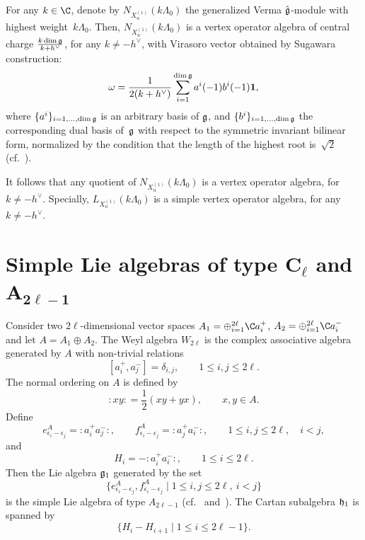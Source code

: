 {\sloppy For any $k \in \C$, denote by $N_{X_{n} ^{(1)}}(k \Lambda _0)$ the
generalized Verma $\hat{\frak g}$-module with highest weight~$k
\Lambda _0$. Then, $N_{X_{n} ^{(1)}}(k \Lambda _0)$ is a vertex
operator algebra of central charge $\frac{k \dim \frak
g}{k+h^{\vee}}$, for any $k \neq - h^{\vee}$, with Virasoro vector
obtained by Sugawara construction:
\begin{gather} \label{Vir-Sugawara}
\omega=\frac{1}{2(k+h^{\vee})}\sum_{i=1}^{\dim {\frak g}}
a^{i}(-1)b^{i}(-1){\bf 1},
\end{gather}
where $\{a^{i}\}_{i=1, \dots, \dim {\frak g}}$ is an arbitrary basis
of ${\frak g}$, and $\{b^{i}\}_{i=1, \dots, \dim {\frak g}}$  the
corresponding dual basis of~${\frak g}$ with respect to the
symmetric invariant bilinear form, normalized by the condition that
the length of the highest root is~$\sqrt{2}$ (cf.~\cite{FrB,FZ,K,LL,L}).

}

It follows that any quotient of $N_{X_{n} ^{(1)}}(k \Lambda _0)$ is
a vertex operator algebra, for $k \neq - h^{\vee}$. Specially,
$L_{X_{n} ^{(1)}}(k \Lambda _0)$ is a simple vertex operator
algebra, for any $k \neq - h^{\vee}$.



\section[Simple Lie algebras of type $C_{\ell}$ and $A_{2\ell -1}$]{Simple Lie algebras of type $\boldsymbol{C_{\ell}}$ and $\boldsymbol{A_{2\ell -1}}$}

Consider two $2 \ell$-dimensional vector spaces $A_1 = \oplus
_{i=1} ^{2 \ell}{\C} a_i ^+$, $ A_2 = \oplus _{i=1}^ {2 \ell} {\C}
a_i^-$ and let $A=A_1 {\oplus} A_2$. The Weyl algebra $W_{2 \ell}$ is
the complex associative algebra generated by $A$ with non-trivial
relations
\[
[a_i ^+,a_j^-]=\delta_{i,j} , \qquad 1 \le i,j \le 2 \ell.
\]
%
The normal ordering on $A$ is def\/ined by
\[
:\!xy\!:    = \frac 1 2 (xy+yx),  \qquad x,y \in A .
\]
Def\/ine
\[
e_{\epsilon_i-\epsilon_j}^A=  :\!a_i ^+ a_j^-\!:, \qquad
f_{\epsilon_i-\epsilon_j}^A=  :\!a_j ^+ a_i^-\!:, \qquad 1 \le i,j
\le 2 \ell, \quad i<j,
\]
and
\[
H_i=-:\!a_i ^+ a_i^-\!:,  \qquad 1 \le i \le 2 \ell.
\]
Then the Lie algebra $\frak g _1$ generated by the set
\[
\big\{ e_{\epsilon_i-\epsilon_j}^A, f_{\epsilon_i-\epsilon_j}^A \; \vert
\; 1 \le i,j \le 2 \ell, \ i < j \big\}
\]
is the simple Lie algebra of type $A_{2 \ell -1}$ (cf.~\cite{Bou}
and~\cite{FF}). The Cartan subalgebra $\frak h _1$ is spanned by
\[
\{ H_i - H_{i+1}  \; \vert \; 1 \le i \le 2 \ell -1 \}.
\]



